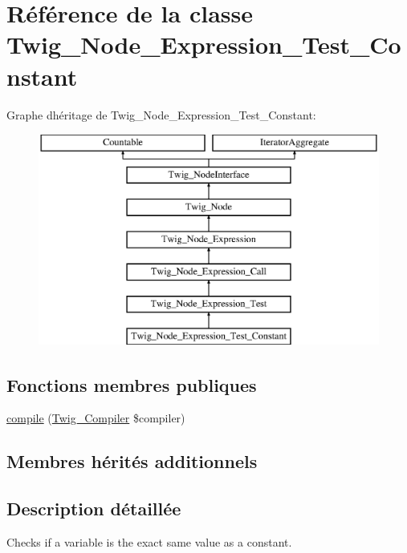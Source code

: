 \hypertarget{class_twig___node___expression___test___constant}{}\section{Référence de la classe Twig\+\_\+\+Node\+\_\+\+Expression\+\_\+\+Test\+\_\+\+Constant}
\label{class_twig___node___expression___test___constant}
Graphe d\textquotesingle{}héritage de Twig\+\_\+\+Node\+\_\+\+Expression\+\_\+\+Test\+\_\+\+Constant\+:\begin{figure}[H]
\begin{center}
\leavevmode
\includegraphics[height=7.000000cm]{class_twig___node___expression___test___constant}
\end{center}
\end{figure}
\subsection*{Fonctions membres publiques}
\begin{DoxyCompactItemize}
\item 
\hyperlink{class_twig___node___expression___test___constant_a4e0faa87c3fae583620b84d3607085da}{compile} (\hyperlink{class_twig___compiler}{Twig\+\_\+\+Compiler} \$compiler)
\end{DoxyCompactItemize}
\subsection*{Membres hérités additionnels}


\subsection{Description détaillée}
Checks if a variable is the exact same value as a constant.


